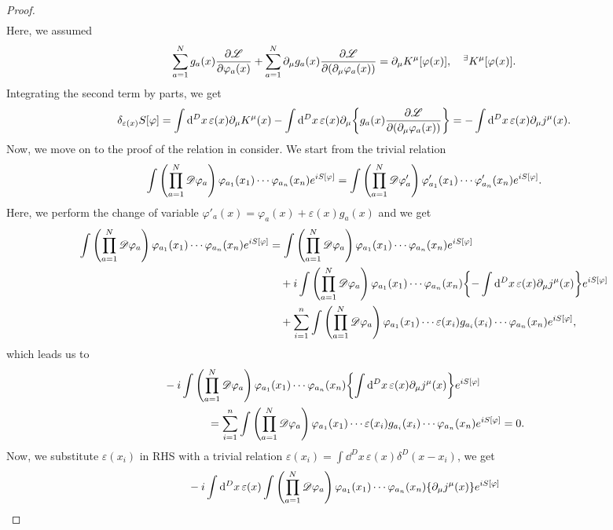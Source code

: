\documentclass{article}
\theoremstyle{definition}
\numberwithin{equation}{section}
\newcommand{\fidim}{\int \qty(\prod_{a = 1}^{N} \mathscr{D}\varphi_a) \, }
\newcommand{\intst}{\int \dd^Dx \,}
\newcommand{\del}{\partial_\mu}
\newcommand{\lag}{\mathscr{L}}
\begin{document}
\begin{proof}
\begin{align}
  \end{align}
  Here, we assumed
  \begin{align}
    \sum_{a = 1}^{N}g_a(x) \pdv{\lag}{\varphi_a(x)} + \sum_{a = 1}^{N}\del g_a(x)\pdv{\lag}{(\del \varphi_a(x))} = \del K^\mu[\varphi(x)], \quad ^\exists K^\mu[\varphi(x)].
  \end{align}
  Integrating the second term by parts, we get 
  \begin{align}
    \delta_{\varepsilon(x)} S[\varphi] = \intst \varepsilon(x) \del K^\mu(x) - \intst \varepsilon(x) \del \qty{ g_a(x)\pdv{\lag}{(\del \varphi_a(x))}}
    = - \intst \varepsilon(x) \del j^\mu(x).
  \end{align}
  Now, we move on to the proof of the relation in consider. We start from the trivial relation
  \begin{align}
    \fidim \varphi_{a_1}(x_1) \cdots \varphi_{a_n}(x_n) e^{iS[\varphi]}
    = \int \qty(\prod_{a = 1}^{N} \mathscr{D}\varphi'_a)\, \varphi'_{a_1}(x_1) \cdots \varphi'_{a_n}(x_n) e^{iS[\varphi]}.
  \end{align}
  Here, we perform the change of variable $\varphi'_a(x) = \varphi_a(x) + \varepsilon(x) g_a(x)$ and we get
  \begin{align}
    \fidim \varphi_{a_1}(x_1) \cdots \varphi_{a_n}(x_n) e^{iS[\varphi]}
    &= \fidim \varphi_{a_1}(x_1) \cdots \varphi_{a_n}(x_n) e^{iS[\varphi]} \notag \\
    &\quad + i\fidim \varphi_{a_1}(x_1) \cdots \varphi_{a_n}(x_n) \qty{- \intst \varepsilon(x) \del j^\mu(x)}e^{iS[\varphi]} \notag \\
    &\quad + \sum_{i = 1}^{n} \fidim \varphi_{a_1}(x_1) \cdots \varepsilon(x_i) g_{a_i}(x_i) \cdots \varphi_{a_n}(x_n)e^{iS[\varphi]},
  \end{align}
  which leads us to
  \begin{align}
    &-i\fidim \varphi_{a_1}(x_1) \cdots \varphi_{a_n}(x_n) \qty{\intst \varepsilon(x) \del j^\mu(x)}e^{iS[\varphi]} \notag \\
    & \quad\quad\quad\quad = \sum_{i = 1}^{n} \fidim \varphi_{a_1}(x_1) \cdots \varepsilon(x_i) g_{a_i}(x_i) \cdots \varphi_{a_n}(x_n)e^{iS[\varphi]} = 0.
  \end{align}
  Now, we substitute $\varepsilon(x_i)$ in RHS with a trivial relation ${\displaystyle \varepsilon(x_i) = \intst \varepsilon(x) \delta^D(x - x_i)}$, we get
  \begin{align}
    &-i\intst \varepsilon(x) \fidim \varphi_{a_1}(x_1) \cdots \varphi_{a_n}(x_n) \qty{\del j^\mu(x)}e^{iS[\varphi]} \notag\\

\end{align}
\end{proof}
\end{document}
